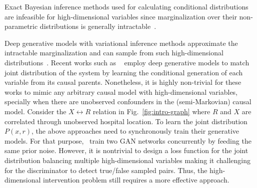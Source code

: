 \documentclass{article}
\newcommand{\red}{\textcolor{red}}
\theoremstyle{plain}
\theoremstyle{definition}
\theoremstyle{remark}
\begin{document}
Exact Bayesian inference methods 
used for calculating conditional distributions are infeasible for high-dimensional variables since marginalization over their non-parametric distributions is generally intractable~\citep{bishop2006pattern}.
%
%
\par
Deep generative models with variational inference methods approximate the intractable marginalization and 
can sample from such high-dimensional distributions~\citep{ho2020denoising, song2020denoising,croitoru2023diffusion}. 
Recent works such as ~\citet{xia2023neural,  chao2023interventional, rahman2024modular} employ deep generative models to match joint distribution of the system
by learning the conditional generation of each variable from its causal parents. 
Nonetheless, it is highly non-trivial for these works to mimic any arbitrary causal model with high-dimensional variables, specially when there are unobserved confounders in the (semi-Markovian) causal model. Consider the $X\leftrightarrow R$ relation in Fig.~\ref{fig:intro-graph} where $R$ and $X$ are correlated through unobserved hospital location. 
To learn the joint distribution $P(x,r)$, the above approaches need to synchronously train their generative models.
For that purpose,~\citet{xia2023neural, rahman2024modular} 
train two GAN networks concurrently by feeding the same prior noise. However, it is nontrivial to design a loss function for the joint distribution balancing multiple high-dimensional variables making it challenging for the discriminator to detect true/false sampled pairs.
Thus, the high-dimensional intervention problem still requires a more effective approach.
%
%
%
\end{document}
